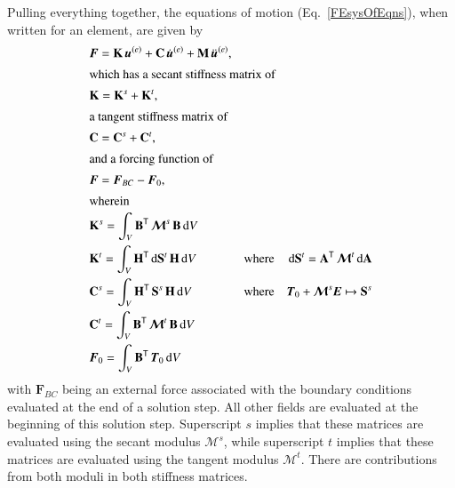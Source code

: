 Pulling everything together, the equations of motion (Eq.~\ref{FEsysOfEqns}), when written for an element, are given by
\begin{subequations}
    \label{EOM}
    \begin{align}
    \mbox{} & \boldsymbol{F} =
    \mathbf{K} \, \boldsymbol{u}^{(e)} + 
    \mathbf{C} \, \dot{\boldsymbol{u}}^{(e)} +
    \mathbf{M} \, \ddot{\boldsymbol{u}}^{(e)} , & & & \\
    \intertext{which has a secant stiffness matrix of}
    \mbox{} & \mathbf{K} = \mathbf{K}^s + \mathbf{K}^t,  & & & \\
    \intertext{a tangent stiffness matrix of}
    \mbox{} & \mathbf{C} = \mathbf{C}^s + \mathbf{C}^t , & & & \\
    \intertext{and a forcing function of}    
    \mbox{} & \boldsymbol{F} = \boldsymbol{F}_{BC} - \boldsymbol{F}_0 , & & & \\
    \intertext{wherein} 
    \mbox{} & \mathbf{K}^s = \int_V \mathbf{B}^{\mathsf{T}} \, 
        \boldsymbol{\mathcal{M}}^s \, \mathbf{B} \, \mathrm{d}V & & & \\
    \mbox{} & \mathbf{K}^t = \int_V \mathbf{H}^{\mathsf{T}} \, 
        \mathrm{d}\mathbf{S}^t \, \mathbf{H} \, \mathrm{d}V 
        & & \text{where} &
        \mathrm{d}\mathbf{S}^t = \mathbf{A}^{\mathsf{T}} \, 
        \boldsymbol{\mathcal{M}}^t \, \mathrm{d} \mathbf{A} \\
        \mbox{} & \mathbf{C}^s = \int_V \mathbf{H}^{\mathsf{T}} \, 
        \mathbf{S}^s \, \mathbf{H} \, \mathrm{d}V
        & & \text{where} & \boldsymbol{T}_0 + 
        \boldsymbol{\mathcal{M}}^s \boldsymbol{E} \mapsto \mathbf{S}^s \\
        \mbox{} & \mathbf{C}^t = \int_V \mathbf{B}^{\mathsf{T}} \, 
        \boldsymbol{\mathcal{M}}^t \, \mathbf{B} \, \mathrm{d}V & & & \\
    \mbox{} & \boldsymbol{F}_0 = \int_V \mathbf{B}^{\mathsf{T}} \, \boldsymbol{T}_0 \,
        \mathrm{d}V & & &
    \end{align} 
\end{subequations}
with $\boldsymbol{F}_{BC}$ being an external force associated with the boundary conditions evaluated at the end of a solution step.  All other fields are evaluated at the beginning of this solution step.  Superscript $s$ implies that these matrices are evaluated using the secant modulus $\boldsymbol{\mathcal{M}}^s$, while superscript $t$ implies that these matrices are evaluated using the tangent modulus $\boldsymbol{\mathcal{M}}^t$.  There are contributions from both moduli in both stiffness matrices.


